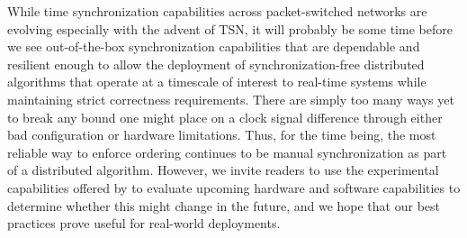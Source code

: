 
While time synchronization capabilities across packet-switched networks are evolving especially with the advent of TSN, it will probably be some time before we see out-of-the-box synchronization capabilities that are dependable and resilient enough to allow the deployment of synchronization-free distributed algorithms that operate at a timescale of interest to real-time systems while maintaining strict correctness requirements. There are simply too many ways yet to break any bound one might place on a clock signal difference through either bad configuration or hardware limitations. Thus, for the time being, the most reliable way to enforce ordering continues to be manual synchronization as part of a distributed algorithm. However, we invite readers to use the experimental capabilities offered by \toolName{} to evaluate upcoming hardware and software capabilities to determine whether this might change in the future, and we hope that our best practices prove useful for real-world deployments.
